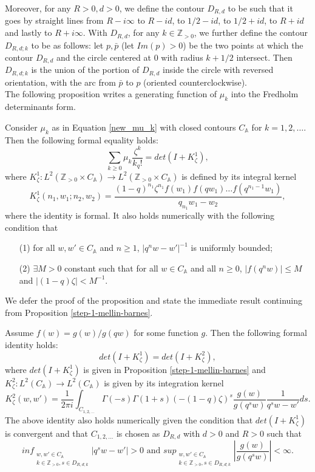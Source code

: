 Moreover, for any $R > 0, d > 0$, we define the contour $D_{R,d}$ to be such that it goes by straight lines from $R - i\infty$ to $R - i d$, to $1/2 - i d$, to $1/2 + id$, to $R + id$ and lastly to $R+i\infty$. With $D_{R,d}$, for any $k \in \mathbb{Z}_{>0}$, we further define the contour $D_{R,d;k}$ to be as follows: let $p, \bar{p}$ (let $Im(p) > 0$) be the two points at which the contour $D_{R,d}$ and the circle centered at 0 with radius $k+1/2$ intersect. Then $D_{R,d;k}$ is the union of the portion of $D_{R,d}$ inside the circle with reversed orientation, with the arc from $\bar{p}$ to $p$ (oriented counterclockwise). \\

The following proposition writes a generating function of $\mu_k$ into the Fredholm determinants form.
\begin{proposition}
\label{step-1-mellin-barnes}
Consider $\mu_k$ as in Equation \ref{new_mu_k} with closed contours $C_{\mathbb{A}}$ for $k = 1,2,\dots$. Then the following formal equality holds:
$$\sum_{k \ge 0} \mu_k \frac{\zeta^k}{k_q!} = det(I+K_{\zeta}^{1}),$$ where $K_{\zeta}^1:L^2(\mathbb{Z}_{>0} \times C_{\mathbb{A}}) \rightarrow L^2(\mathbb{Z}_{>0} \times C_{\mathbb{A}})$ is defined by its integral kernel $$K_{\zeta}^1(n_1, w_1; n_2, w_2)= \frac{(1-q)^{n_1} \zeta^{n_1} f(w_1) f(qw_1) \dots f(q^{n_1-1}w_1)}{q_{n_1}w_1 - w_2},$$
where the identity is formal. It also holds numerically with the following condition that
\begin{enumerate}
\item[(1)] for all $w, w' \in C_{\mathbb{A}}$ and $n \ge 1$, $|q^n w - w'|^{-1}$ is uniformly bounded;
\item[(2)] $\exists M > 0$ constant such that for all $w \in C_{\mathbb{A}}$ and all $n \ge 0$, $|f(q^n w)| \le M$ and $|(1-q) \zeta| < M^{-1}$.
\end{enumerate}
\end{proposition}

We defer the proof of the proposition and state the immediate result continuing from Proposition \ref{step-1-mellin-barnes}.

\begin{proposition}
\label{step-2-mellin-barnes}
Assume $f(w) = g(w) / g(qw)$ for some function $g$. Then the following formal identity holds:
$$det(I+K_{\zeta}^1) = det(I+K_{\zeta}^2),$$ where $det(I+K_{\zeta}^1)$ is given in Proposition \ref{step-1-mellin-barnes} and $K_{\zeta}^2:L^2(C_{\mathbb{A}}) \rightarrow L^2(C_{\mathbb{A}})$ is given by its integration kernel $$K_{\zeta}^2(w,w') = \frac{1}{2 \pi i} \int_{C_{1,2,\dots}} \Gamma(-s) \Gamma(1+s) (-(1-q)\zeta)^s \frac{g(w)}{g(q^sw)} \frac{1}{q^sw - w'} ds.$$
The above identity also holds numerically given the condition that $det(I+K_{\zeta}^1)$ is convergent and that $C_{1,2,\dots}$ is chosen as $D_{R,d}$ with $d > 0$ and $R > 0$ such that $$ inf_{\substack{ {w, w' \in C_{\mathbb{A}}} \\ {k \in \mathbb{Z}_{>0}, s \in D_{R, d;k}} }} |q^sw - w'| > 0 \text{ and } sup_{\substack{ {w,w' \in C_{\mathbb{A}}} \\ {k \in \mathbb{Z}_{>0}, s \in D_{R,d;k}} }} \left| \frac{g(w)}{g(q^s w)} \right| < \infty.$$
\end{proposition}

